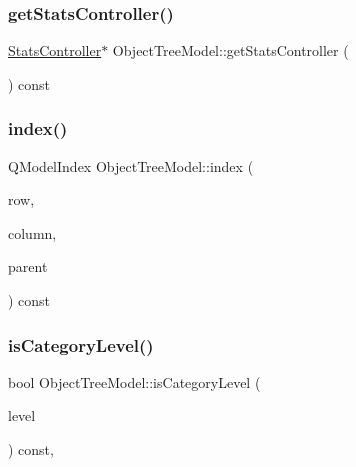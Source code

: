 \subsubsection{\texorpdfstring{getStatsController()}{getStatsController()}}
{\footnotesize\ttfamily \mbox{\hyperlink{class_stats_controller}{Stats\+Controller}}$\ast$ Object\+Tree\+Model\+::get\+Stats\+Controller (\begin{DoxyParamCaption}{ }\end{DoxyParamCaption}) const\hspace{0.3cm}{\ttfamily [inline]}}

\mbox{\label{class_object_tree_model_afc20c3ca6732ededf4de9d3e184b21ae}} 
\subsubsection{\texorpdfstring{index()}{index()}}
{\footnotesize\ttfamily Q\+Model\+Index Object\+Tree\+Model\+::index (\begin{DoxyParamCaption}\item[{int}]{row,  }\item[{int}]{column,  }\item[{const Q\+Model\+Index \&}]{parent }\end{DoxyParamCaption}) const}

\mbox{\label{class_object_tree_model_a15b2b304cdd35cd8957bea2eb35255dd}} 
\subsubsection{\texorpdfstring{isCategoryLevel()}{isCategoryLevel()}}
{\footnotesize\ttfamily bool Object\+Tree\+Model\+::is\+Category\+Level (\begin{DoxyParamCaption}\item[{const Q\+Model\+Index \&}]{level }\end{DoxyParamCaption}) const\hspace{0.3cm}{\ttfamily [inline]}, {\ttfamily [protected]}}

\mbox{\label{class_object_tree_model_a24f47f6e2b41adedd4779747786d65f6}} 
